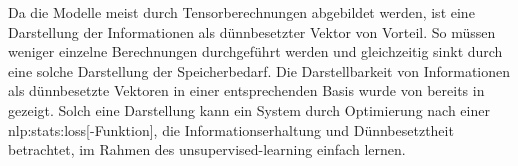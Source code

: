 \label{ssec:dartstellbarkeit}
Da die Modelle meist durch Tensorberechnungen abgebildet werden,
ist eine Darstellung der Informationen als dünnbesetzter Vektor
von Vorteil.
So müssen weniger einzelne Berechnungen durchgeführt werden
und gleichzeitig sinkt durch eine solche Darstellung der Speicherbedarf.\autocite{10.1007/bf02331346}
Die Darstellbarkeit von Informationen als dünnbesetzte Vektoren 
in einer entsprechenden Basis wurde von \citeauthor{olshausen1996emergence}
bereits \citeyear{olshausen1996emergence} in 
gezeigt. \autocite{olshausen1996emergence}
Solch eine Darstellung kann ein System
durch Optimierung nach einer \gls{nlp:stats:loss}[-Funktion],
die Informationserhaltung und Dünnbesetztheit betrachtet,
im Rahmen des \gls{unsupervised-learning}
einfach lernen. \autocite[Formel 2-4]{olshausen1996emergence}

